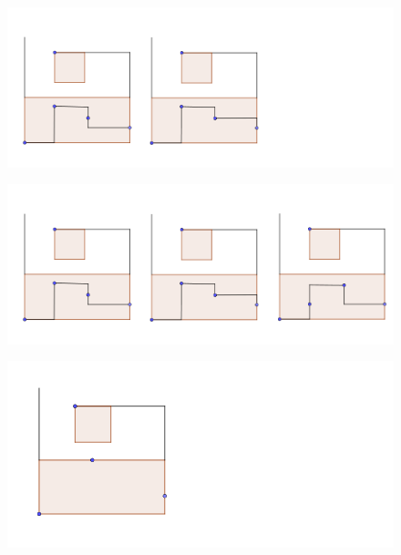 \documentclass{beamer}
\begin{document}
\begin{frame}
\begin{figure}[h]
\includegraphics[width=\textwidth]{Cajas-4-puntos-2}
\end{figure}
\end{frame}
\begin{frame}
\begin{figure}[h]
\includegraphics[width=\textwidth]{Cajas-4-puntos-3}
\end{figure}
\end{frame}
\begin{frame}
\begin{figure}[h]
\includegraphics[width=\textwidth]{Cajas-3-puntos-no-puede}
\end{figure}
\end{frame}
\end{document}
